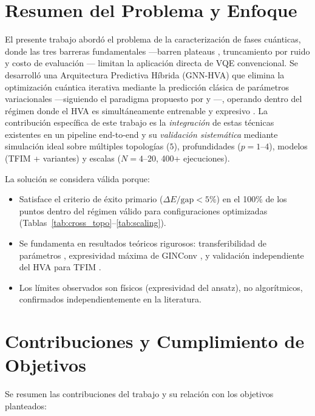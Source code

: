 \documentclass[11pt,a4paper,spanish]{book}
\begin{document}
\section{Resumen del Problema y Enfoque}

El presente trabajo abordó el problema de la caracterización de fases cuánticas, donde las tres barreras fundamentales ---barren plateaus \citep{mcclean2018}, truncamiento por ruido \citep{mele2026} y costo de evaluación \citep{tilly2022}--- limitan la aplicación directa de VQE convencional. Se desarrolló una Arquitectura Predictiva Híbrida (GNN-HVA) que elimina la optimización cuántica iterativa mediante la predicción clásica de parámetros variacionales ---siguiendo el paradigma propuesto por \citet{miao2024} y \citet{zhang2025}---, operando dentro del régimen donde el HVA es simultáneamente entrenable \citep{cerezo2021} y expresivo \citep{wiersema2020}. La contribución específica de este trabajo es la \emph{integración} de estas técnicas existentes en un pipeline end-to-end y su \emph{validación sistemática} mediante simulación ideal sobre múltiples topologías ($5$), profundidades ($p = 1$--$4$), modelos (TFIM + variantes) y escalas ($N = 4$--$20$, 400+ ejecuciones).

La solución se considera válida porque:
\begin{itemize}
    \item Satisface el criterio de éxito primario ($\Delta E/\text{gap} < 5\%$) en el 100\% de los puntos dentro del régimen válido para configuraciones optimizadas (Tablas~\ref{tab:cross_topo}--\ref{tab:scaling}).
    \item Se fundamenta en resultados teóricos rigurosos: transferibilidad de parámetros \citep{mele2022, puig2025}, expresividad máxima de GINConv \citep{xu2019}, y validación independiente del HVA para TFIM \citep{tripathi2026}.
    \item Los límites observados son físicos (expresividad del ansatz), no algorítmicos, confirmados independientemente en la literatura.
\end{itemize}

\section{Contribuciones y Cumplimiento de Objetivos}

Se resumen las contribuciones del trabajo y su relación con los objetivos planteados:
\end{document}
